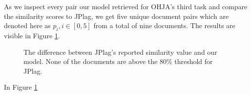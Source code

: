 As we inspect every pair our model retrieved for OHJA's third task and compare the similarity scores to JPlag, we get five unique document pairs which are denoted here as $p_i, i \in [0, 5]$ from a total of nine documents. The results are visible in Figure \ref{fig-jplag-sd-ohja3}.

\begin{figure}[ht]
    \centering
    \setlength\figureheight{5cm}
    \setlength{}
    
    \caption{The difference between JPlag's reported similarity value and our model. None of the documents are above the 80\% threshold for JPlag.}
    \label{fig-jplag-sd-ohja3}
\end{figure}

In Figure \ref{fig-jplag-sd-ohja3}

\newpage




